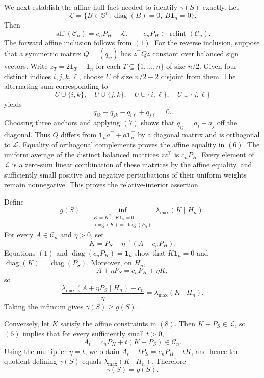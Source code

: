 We next establish the affine-hull fact needed to identify \(\gamma(S)\) exactly.  Let
\[
\mathcal L=\{B\in\mathbb S^n:\operatorname{diag}(B)=0,\ B\mathbf1_n=0\}.
\]
Then
\[
\operatorname{aff}(\mathcal C_n)=c_nP_H+\mathcal L,
\qquad
c_nP_H\in\operatorname{relint}(\mathcal C_n).
\tag{6}
\]
The forward affine inclusion follows from \((1)\).  For the reverse inclusion, suppose that a symmetric matrix \(Q=(q_{ij})\) has \(z^\top Qz\) constant over balanced sign vectors.  Write \(z_T=2\mathbf1_T-\mathbf1_n\) for each \(T\subseteq\{1,\ldots,n\}\) of size \(n/2\).  Given four distinct indices \(i,j,k,\ell\), choose \(U\) of size \(n/2-2\) disjoint from them.  The alternating sum corresponding to
\[
U\cup\{i,k\},\quad U\cup\{j,k\},\quad
U\cup\{i,\ell\},\quad U\cup\{j,\ell\}
\]
yields
\[
q_{ik}-q_{jk}-q_{i\ell}+q_{j\ell}=0.
\tag{7}
\]
Choosing three anchors and applying \((7)\) shows that \(q_{ij}=a_i+a_j\) off the diagonal.  Thus \(Q\) differs from \(\mathbf1_na^\top+a\mathbf1_n^\top\) by a diagonal matrix and is orthogonal to \(\mathcal L\).  Equality of orthogonal complements proves the affine equality in \((6)\).  The uniform average of the distinct balanced matrices \(zz^\top\) is \(c_nP_H\).  Every element of \(\mathcal L\) is a zero-sum linear combination of these matrices by the affine equality, and sufficiently small positive and negative perturbations of their uniform weights remain nonnegative.  This proves the relative-interior assertion.

Define
\[
g(S)=\inf_{\substack{K=K^\top,\ K\mathbf1_n=0\\
\operatorname{diag}(K)=\operatorname{diag}(P_S)}}
\lambda_{\max}(K\mid H_n).
\tag{8}
\]
For every \(A\in\mathcal C_n\) and \(\eta>0\), set
\[
K=P_S+\eta^{-1}(A-c_nP_H).
\tag{9}
\]
Equations \((1)\) and \(\operatorname{diag}(c_nP_H)=\mathbf1_n\) show that \(K\mathbf1_n=0\) and \(\operatorname{diag}(K)=\operatorname{diag}(P_S)\).  Moreover, on \(H_n\),
\[
A+\eta P_S=c_nP_H+\eta K,
\]
so
\[
\frac{\lambda_{\max}(A+\eta P_S\mid H_n)-c_n}{\eta}
=\lambda_{\max}(K\mid H_n).
\tag{10}
\]
Taking the infimum gives \(\gamma(S)\geq g(S)\).

Conversely, let \(K\) satisfy the affine constraints in \((8)\).  Then \(K-P_S\in\mathcal L\), so \((6)\) implies that for every sufficiently small \(t>0\),
\[
A_t=c_nP_H+t(K-P_S)\in\mathcal C_n.
\tag{11}
\]
Using the multiplier \(\eta=t\), we obtain \(A_t+tP_S=c_nP_H+tK\), and hence the quotient defining \(\gamma(S)\) equals \(\lambda_{\max}(K\mid H_n)\).  Therefore
\[
\gamma(S)=g(S).
\tag{12}
\]

